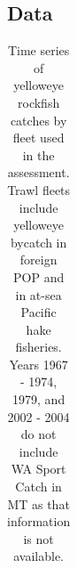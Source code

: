 \documentclass[
]{scrartcl}
\begin{document}
\endgroup

\newpage{}

\subsection{Data}\label{data}

\begin{landscape}
\begingroup
\fontsize{9.0pt}{10.8pt}\selectfont

\begin{longtable}{>{\raggedleft\arraybackslash}p{\dimexpr 56.25pt -2\tabcolsep-1.5\arrayrulewidth}>{\raggedleft\arraybackslash}p{\dimexpr 56.25pt -2\tabcolsep-1.5\arrayrulewidth}>{\raggedleft\arraybackslash}p{\dimexpr 56.25pt -2\tabcolsep-1.5\arrayrulewidth}>{\raggedleft\arraybackslash}p{\dimexpr 56.25pt -2\tabcolsep-1.5\arrayrulewidth}>{\raggedleft\arraybackslash}p{\dimexpr 56.25pt -2\tabcolsep-1.5\arrayrulewidth}>{\raggedleft\arraybackslash}p{\dimexpr 56.25pt -2\tabcolsep-1.5\arrayrulewidth}>{\raggedleft\arraybackslash}p{\dimexpr 56.25pt -2\tabcolsep-1.5\arrayrulewidth}>{\raggedleft\arraybackslash}p{\dimexpr 56.25pt -2\tabcolsep-1.5\arrayrulewidth}>{\raggedleft\arraybackslash}p{\dimexpr 56.25pt -2\tabcolsep-1.5\arrayrulewidth}>{\raggedleft\arraybackslash}p{\dimexpr 56.25pt -2\tabcolsep-1.5\arrayrulewidth}}

\caption{\label{tbl-all_removals}Time series of yelloweye rockfish
catches by fleet used in the assessment. Trawl fleets include yelloweye
bycatch in foreign POP and in at-sea Pacific hake fisheries. Years 1967
- 1974, 1979, and 2002 - 2004 do not include WA Sport Catch in MT as
that information is not available.}

\tabularnewline


\end{longtable}
\end{landscape}
\end{document}
